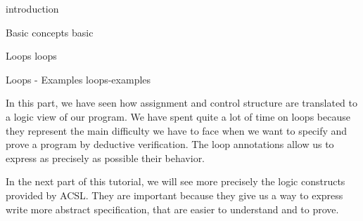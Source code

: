 \begin{levelTwo}
  {}
  {introduction}
\end{levelTwo}

\begin{levelTwo}
  {Basic concepts}
  {basic}
\end{levelTwo}

\begin{levelTwo}
  {Loops}
  {loops}
\end{levelTwo}

\begin{levelTwo}
  {Loops - Examples}
  {loops-examples}
\end{levelTwo}


\horizontalLine
\newpage


In this part, we have seen how assignment and control structure are translated
to a logic view of our program. We have spent quite a lot of time on loops
because they represent the main difficulty we have to face when we want to
specify and prove a program by deductive verification. The loop annotations
allow us to express as precisely as possible their behavior.



In the next part of this tutorial, we will see more precisely the logic
constructs provided by ACSL. They are important because they give us a way to
express write more abstract specification, that are easier to understand and
to prove.
